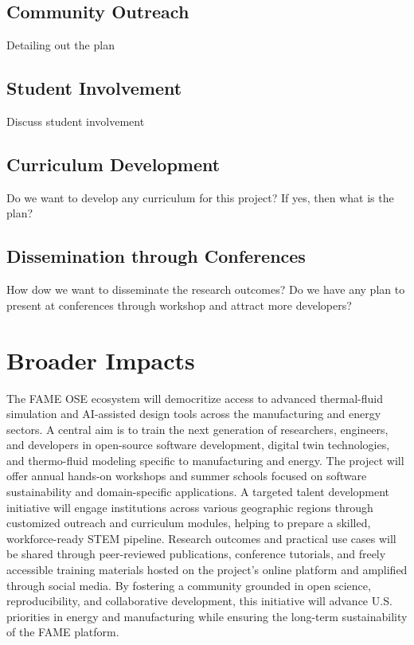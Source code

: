 \documentclass[11pt]{article}
\begin{document}
\subsection{Community Outreach} 
Detailing out the plan

\subsection{Student Involvement}  
Discuss student involvement

\subsection{Curriculum Development}  
Do we want to develop any curriculum for this project? If yes, then what is the plan?

\subsection{Dissemination through Conferences}  
How dow we want to disseminate the research outcomes? Do we have any plan to present at conferences through workshop and attract more developers?

\section{Broader Impacts}
The FAME OSE ecosystem will democritize access to advanced thermal-fluid simulation and AI-assisted design tools across the manufacturing and energy sectors. A central aim is to train the next generation of researchers, engineers, and developers in open-source software development, digital twin technologies, and thermo-fluid modeling specific to manufacturing and energy. The project will offer annual hands-on workshops and summer schools focused on software sustainability and domain-specific applications. A targeted talent development initiative will engage institutions across various geographic regions through customized outreach and curriculum modules, helping to prepare a skilled, workforce-ready STEM pipeline. Research outcomes and practical use cases will be shared through peer-reviewed publications, conference tutorials, and freely accessible training materials hosted on the project's online platform and amplified through social media. By fostering a community grounded in open science, reproducibility, and collaborative development, this initiative will advance U.S. priorities in energy and manufacturing while ensuring the long-term sustainability of the FAME platform.
\end{document}

